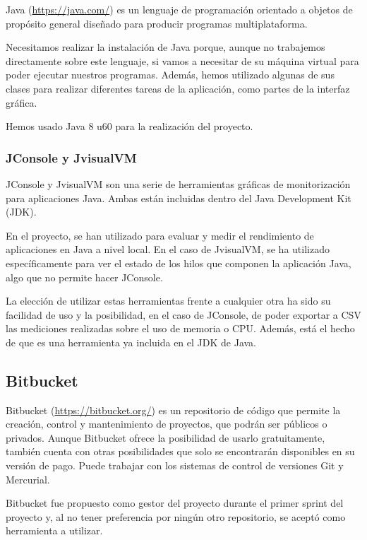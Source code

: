 Java (\url{https://java.com/}) es un lenguaje de programación orientado a objetos de propósito general diseñado para producir programas multiplataforma.

Necesitamos realizar la instalación de Java porque, aunque no trabajemos directamente sobre este lenguaje, si vamos a necesitar de su máquina virtual para poder ejecutar nuestros programas. Además, hemos utilizado algunas de sus clases para realizar diferentes tareas de la aplicación, como partes de la interfaz gráfica.

Hemos usado Java 8 u60 para la realización del proyecto.

\subsubsection{JConsole y JvisualVM}\label{DefJConsole}\label{DefJvisualVM}

JConsole y JvisualVM son una serie de herramientas gráficas de monitorización para aplicaciones Java. Ambas están incluidas dentro del Java Development Kit (JDK).

En el proyecto, se han utilizado para evaluar y medir el rendimiento de aplicaciones en Java a nivel local. En el caso de JvisualVM, se ha utilizado específicamente para ver el estado de los hilos que componen la aplicación Java, algo que no permite hacer JConsole.

La elección de utilizar estas herramientas frente a cualquier otra ha sido su facilidad de uso y la posibilidad, en el caso de JConsole, de poder exportar a CSV las mediciones realizadas sobre el uso de memoria o CPU. Además, está el hecho de que es una herramienta ya incluida en el JDK de Java.

\subsection{Bitbucket}\label{DefBitbucket}
Bitbucket (\url{https://bitbucket.org/}) es un repositorio de código que permite la creación, control y mantenimiento de proyectos, que podrán ser públicos o privados. Aunque Bitbucket ofrece la posibilidad de usarlo gratuitamente, también cuenta con otras posibilidades que solo se encontrarán disponibles en su versión de pago. Puede trabajar con los sistemas de control de versiones Git y Mercurial.

Bitbucket fue propuesto como gestor del proyecto durante el primer sprint del proyecto y, al no tener preferencia por ningún otro repositorio, se aceptó como herramienta a utilizar.

